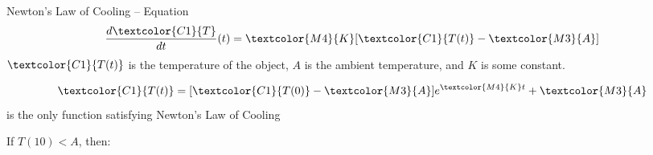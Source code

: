 \begin{frame}[t]
\begin{block}{Newton's Law of Cooling -- Equation~}
\[\frac{d\textcolor{C1}{T}}{dt}(t) = \textcolor{M4}{K}[\textcolor{C1}{T(t)}-\textcolor{M3}{A}]\]
$\textcolor{C1}{T(t)}$ is the temperature of the object, \textcolor{M3}{$A$} is the ambient temperature, and \textcolor{M4}{$K$} is some constant.
\end{block}

\[\textcolor{C1}{T(t)} = [\textcolor{C1}{T(0)}-\textcolor{M3}{A}]e^{\textcolor{M4}{K}t}+\textcolor{M3}{A}\]
is the only function satisfying Newton's Law of Cooling
\pause

\AnswerSpace{}

\begin{multicols}{2}
If $T(10)<A$, then:
\columnbreak


\end{multicols}

\end{frame}

